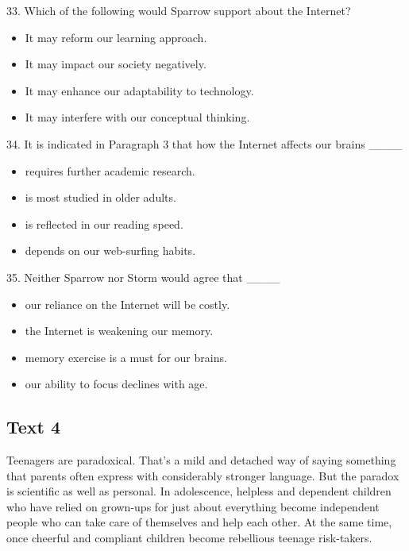 \documentclass[UTF8,11pt]{ctexart}
\begin{document}
33. Which of the following would Sparrow support about the Internet?


\begin{itemize}[leftmargin=2em,itemsep=.2em,topsep=.4em]\item[A.] It may reform our learning approach.
\item[B.] It may impact our society negatively.
\item[C.] It may enhance our adaptability to technology.
\item[D.] It may interfere with our conceptual thinking.
\end{itemize}

34. It is indicated in Paragraph 3 that how the Internet affects our brains \_\_\_\_


\begin{itemize}[leftmargin=2em,itemsep=.2em,topsep=.4em]\item[A.] requires further academic research.
\item[B.] is most studied in older adults.
\item[C.] is reflected in our reading speed.
\item[D.] depends on our web-surfing habits.
\end{itemize}

35. Neither Sparrow nor Storm would agree that \_\_\_\_


\begin{itemize}[leftmargin=2em,itemsep=.2em,topsep=.4em]\item[A.] our reliance on the Internet will be costly.
\item[B.] the Internet is weakening our memory.
\item[C.] memory exercise is a must for our brains.
\item[D.] our ability to focus declines with age.
\end{itemize}

\subsection*{\textbf{Text 4}}


Teenagers are paradoxical. That’s a mild and detached way of saying something that parents often express with considerably stronger language. But the paradox is scientific as well as personal. In adolescence, helpless and dependent children who have relied on grown-ups for just about everything become independent people who can take care of themselves and help each other. At the same time, once cheerful and compliant children become rebellious teenage risk-takers.
\end{document}
